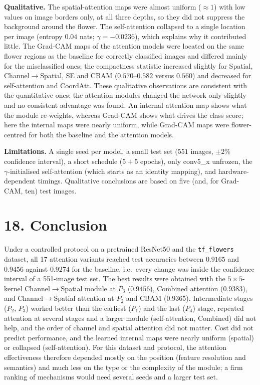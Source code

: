 \documentclass[10pt]{article}
\begin{document}
\textbf{Qualitative.} The spatial-attention maps were almost uniform ($\approx1$)
with low values on image borders only, at all three depths, so they did not
suppress the background around the flower. The self-attention collapsed to a
single location per image (entropy $0.04$ nats; $\gamma=-0.0236$), which
explains why it contributed little. The Grad-CAM maps of the attention models
were located on the same flower regions as the baseline for correctly
classified images and differed mainly for the misclassified ones; the
compactness statistic increased slightly for Spatial, Channel$\rightarrow$Spatial,
SE and CBAM ($0.570$--$0.582$ versus $0.560$) and decreased for self-attention
and CoordAtt. These qualitative observations are consistent with the
quantitative ones: the attention modules changed the network only slightly
and no consistent advantage was found. An internal attention map shows what
the module re-weights, whereas Grad-CAM shows what drives the class score;
here the internal maps were nearly uniform, while Grad-CAM maps were
flower-centred for both the baseline and the attention models.

\textbf{Limitations.} A single seed per model, a small test set ($551$
images, $\pm2\%$ confidence interval), a short schedule ($5+5$ epochs), only
conv5\_x unfrozen, the $\gamma$-initialised self-attention (which starts as
an identity mapping), and hardware-dependent timings. Qualitative
conclusions are based on five (and, for Grad-CAM, ten) test images.

\section*{18. Conclusion}

Under a controlled protocol on a pretrained ResNet50 and the \texttt{tf\_flowers}
dataset, all 17 attention variants reached test accuracies between $0.9165$ and
$0.9456$ against $0.9274$ for the baseline, i.e.\ every change was inside the
confidence interval of a 551-image test set. The best results were obtained
with the $5\times5$-kernel Channel$\rightarrow$Spatial module at $P_3$
($0.9456$), Combined attention ($0.9383$), and Channel$\rightarrow$Spatial
attention at $P_2$ and CBAM ($0.9365$). Intermediate stages ($P_2$, $P_3$)
worked better than the earliest ($P_1$) and the last ($P_4$) stage, repeated
attention at several stages and a larger module (self-attention, Combined) did
not help, and the order of channel and spatial attention did not matter. Cost
did not predict performance, and the learned internal maps were nearly uniform
(spatial) or collapsed (self-attention). For this dataset and protocol, the
attention effectiveness therefore depended mostly on the position (feature
resolution and semantics) and much less on the type or the complexity of the
module; a firm ranking of mechanisms would need several seeds and a larger
test set.
\end{document}
